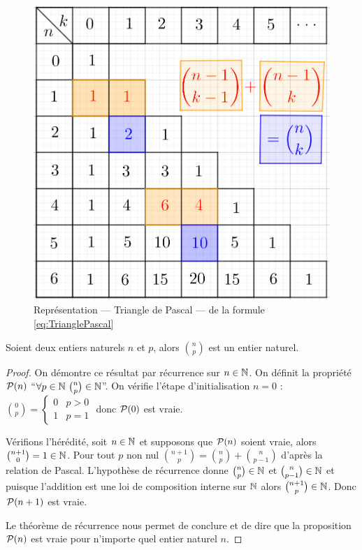 \begin{figure}
    \centering
    \includegraphics[scale=0.7]{./Triangle-de-Pascal-01-3.png}
    \caption{Représentation --- Triangle de Pascal --- de la formule \eqref{eq:TrianglePascal}}
    \label{fig:TrianglePascal}
\end{figure}
\begin{prop}
  Soient deux entiers naturels \(n\) et \(p\), alors \(\binom{n}{p}\) est un entier naturel.
\end{prop}
\begin{proof}
  On démontre ce résultat par récurrence sur \(n\in\N\). On définit la propriété \(\P(n)\) ``\(\forall p \in \N \ \binom{n}{p}\in\N\)''. On vérifie l'étape d'initialisation \(n=0\) : \(\binom{0}{p}=\begin{cases} 0 & p>0 \\ 1 & p=1\end{cases}\) donc \(\P(0)\) est vraie. 
  
Vérifions l'hérédité, soit \(n \in \N\) et supposons que \(\P(n)\) soient vraie, alors \(\binom{n+1}{0}=1\in \N\). Pour tout \(p\) non nul \(\binom{n+1}{p}=\binom{n}{p}+\binom{n}{p-1}\) d'après la relation de Pascal. L'hypothèse de récurrence donne \(\binom{n}{p}\in\N\) et \(\binom{n}{p-1}\in\N\) et puisque l'addition est une loi de composition interne sur \(\N\) alors \(\binom{n+1}{p}\in\N\). Donc \(\P(n+1)\) est vraie. 

Le théorème de récurrence nous permet de conclure et de dire que la proposition \(\P(n)\) est vraie pour n'importe quel entier naturel \(n\).
\end{proof}

